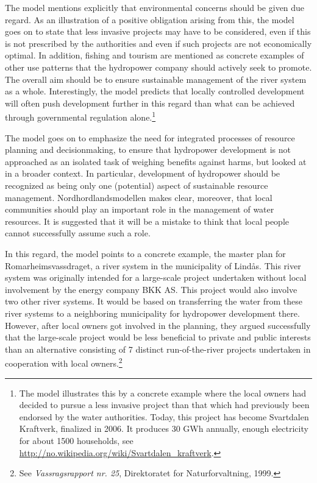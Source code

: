 The model mentions explicitly that environmental concerns should be given due regard. As an illustration of a positive obligation arising from this, the model goes on to state that less invasive projects may have to be considered, even if this is not prescribed by the authorities and even if such projects are not economically optimal. In addition, fishing and tourism are mentioned as concrete examples of other use patterns that the hydropower company should actively seek to promote. The overall aim should be to ensure sustainable management of the river system as a whole. Interestingly, the model predicts that locally controlled development will often push development further in this regard than what can be achieved through governmental regulation alone.\footnote{The model illustrates this by a concrete example where the local owners had decided to pursue a less invasive project than that which had previously been endorsed by the water authorities. Today, this project has become Svartdalen Kraftverk, finalized in 2006. It produces 30 GWh annually, enough electricity for about 1500 households, see \url{http://no.wikipedia.org/wiki/Svartdalen_kraftverk}.} 

The model goes on to emphasize the need for integrated processes of resource planning and decisionmaking, to ensure that hydropower development is not approached as an isolated task of weighing benefits against harms, but looked at in a broader context. In particular, development of hydropower should be recognized as being only one (potential) aspect of sustainable resource management. Nordhordlandsmodellen makes clear, moreover, that local communities should play an important role in the management of water resources. It is suggested that it will be a mistake to think that local people cannot successfully assume such a role. 

In this regard, the model points to a concrete example, the master plan for Romarheimsvassdraget, a river system in the municipality of Lindås. This river system was originally intended for a large-scale project undertaken without local involvement by the energy company BKK AS. This project would also involve two other river systems. It would be based on transferring the water from these river systems to a neighboring municipality for hydropower development there. However, after local owners got involved in the planning, they argued successfully that the large-scale project would be less beneficial to private and public interests than an alternative consisting of 7 distinct run-of-the-river projects undertaken in cooperation with local owners.\footnote{See {\it Vassragsrapport nr. 25}, Direktoratet for Naturforvaltning, 1999.}

